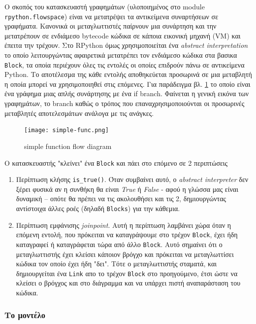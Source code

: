 Ο σκοπός του κατασκευαστή γραφημάτων (υλοποιημένος στο module
\texttt{rpython.flowspace}) είναι να μετατρέψει τα αντικείμενα συναρτήσεων σε
γραφήματα. Κανονικά οι μεταγλωττιστές παίρνουν μια συνάρτηση και την μετατρέπουν
σε ενδιάμεσο bytecode κώδικα σε κάποια εικονική μηχανή (VM) και έπειτα την
τρέχουν. Στο RPython όμως χρησιμοποιείται ένα \textit{abstract interpretation}
το οποίο λειτουργώντας αφαιρετικά μετατρέπει τον ενδιάμεσο κώδικα στα βασικα
\texttt{Block}, τα οποία περιέχουν όλες τις εντολές οι οποίες επιδρούν πάνω σε
αντικείμενα Python. Το αποτέλεσμα της κάθε εντολής αποθηκεύεται προσωρινά σε μια
μεταβλητή η οποία μπορεί να χρησιμοποιηθεί στις επόμενες. Για παράδειγμα βλ.
\ref{figure-2} το οποίο είναι ένα γράφημα μιας απλής συνάρτησης με ένα if
branch. Φαίνεται η γενική εικόνα των γραφημάτων, το branch καθώς ο τρόπος που
επαναχρησιμοποιούνται οι προσωρινές μεταβλητές αποτελεσμάτων ανάλογα με τις
ανάγκες.

\begin{figure}[h]
\centering
\texttt{[image: simple-func.png]}
\caption{simple function flow diagram}
\label{figure-2}
\end{figure}

Ο κατασκευαστής "κλείνει" ένα \texttt{Block} και πάει στο επόμενο σε 2 
περιπτώσεις

\begin{enumerate}

\item Περίπτωση κλήσης \texttt{is\_true()}. Όταν συμβαίνει αυτό, ο \textit{
abstract interpreter} δεν ξέρει φυσικά αν η συνθήκη θα είναι \textit{True} ή
\textit{False} - αφού η γλώσσα μας είναι δυναμική – οπότε θα πρέπει να τις 
ακολουθήσει και τις 2, δημιουργώντας αντίστοιχα άλλες ροές (δηλαδή
\texttt{Blocks}) για την κάθεμια.

\item Περίπτωση εμφάνισης \textit{joinpoint}. Αυτή η περίπτωση λαμβάνει χώρα
όταν η επόμενη εντολή, που πρόκειται να καταγράψουμε στο τρέχον \texttt{Block},
έχει ήδη καταγραφεί ή καταγράφεται τώρα από άλλο \texttt{Block}. Αυτό σημαίνει
ότι ο μεταγλωττιστής έχει κλείσει κάποιον βρόγχο και πρόκειται να μεταγλωττίσει
κώδικα τον οποίο έχει ήδη "δει". Τότε ο μεταγλωττιστής σταματά, και
δημιουργείται ένα \texttt{Link} απο το τρέχον \texttt{Block} στο προηγούμενο,
έτσι ώστε να κλείσει ο βρόγχος και στο διάγραμμα και να υπάρχει πιστή
αναπαράσταση του κώδικα.

\end{enumerate}

\subsubsection{Το μοντέλο}

